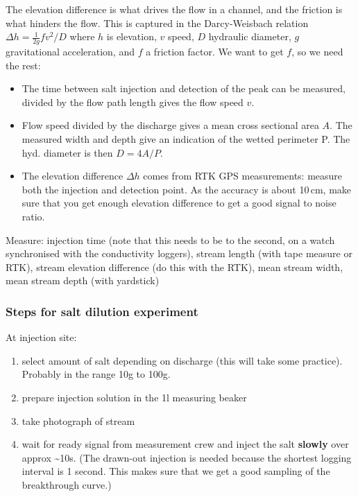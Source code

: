 \documentclass[DIV=15,halfparskip,11pt,headinclude]{scrartcl}
\begin{document}
The elevation difference is what drives the flow in a channel, and the
friction is what hinders the flow.  This is captured in the
Darcy-Weisbach relation $\Delta h = \frac{1}{2g} f v^2/D$ where $h$ is
elevation, $v$ speed, $D$ hydraulic diameter, $g$ gravitational
acceleration, and $f$ a friction factor.  We want to get $f$, so we
need the rest:

\begin{itemize}
\item The time between salt injection and detection of the peak can be measured,
divided by the flow path length gives the flow speed $v$.
\item Flow speed divided by the discharge gives a mean cross sectional
area $A$.  The measured width and depth give an indication of the wetted
perimeter P.  The hyd. diameter is then $D = 4A/P$.
\item The elevation difference $\Delta h$ comes from RTK GPS measurements: measure both
the injection and detection point.  As the accuracy is about 10\,cm,
make sure that you get enough elevation difference to get a good
signal to noise ratio.
\end{itemize}





Measure: injection time (note that this needs to be to the second, on a
watch synchronised with the conductivity loggers), stream length (with
tape measure or RTK), stream elevation difference (do this with the
RTK), mean stream width, mean stream depth (with yardstick)

\subsubsection{Steps for salt dilution experiment}
\label{sec-2-2}

At injection site:
\begin{enumerate}
\item select amount of salt depending on discharge (this will take some
practice).  Probably in the range 10g to 100g.
\item prepare injection solution in the 1l measuring beaker
 \item take photograph of stream
\item wait for ready signal from measurement crew and inject the salt
\textbf{slowly} over approx \textasciitilde{}10s.  (The drawn-out injection is needed
because the shortest logging interval is 1 second.  This makes sure
that we get a good sampling of the breakthrough curve.)
\end{enumerate}
\end{document}
